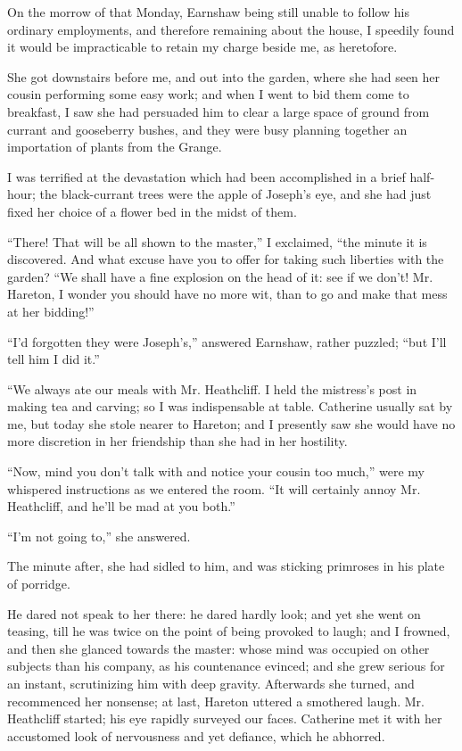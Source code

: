 \par On the morrow of that Monday, Earnshaw being still unable to follow his ordinary employments, and therefore remaining about the house, I speedily found it would be impracticable to retain my charge beside me, as heretofore.
\par She got downstairs before me, and out into the garden, where she had seen her cousin performing some easy work; and when I went to bid them come to breakfast, I saw she had persuaded him to clear a large space of ground from currant and gooseberry bushes, and they were busy planning together an importation of plants from the Grange.
\par I was terrified at the devastation which had been accomplished in a brief half-hour; the black-currant trees were the apple of Joseph's eye, and she had just fixed her choice of a flower bed in the midst of them.
\par “There! That will be all shown to the master,” I exclaimed, “the minute it is discovered. And what excuse have you to offer for taking such liberties with the garden? “We shall have a fine explosion on the head of it: see if we don't! Mr. Hareton, I wonder you should have no more wit, than to go and make that mess at her bidding!”
\par “I'd forgotten they were Joseph's,” answered Earnshaw, rather puzzled; “but I'll tell him I did it.”
\par “We always ate our meals with Mr. Heathcliff. I held the mistress's post in making tea and carving; so I was indispensable at table. Catherine usually sat by me, but today she stole nearer to Hareton; and I presently saw she would have no more discretion in her friendship than she had in her hostility.
\par “Now, mind you don't talk with and notice your cousin too much,” were my whispered instructions as we entered the room. “It will certainly annoy Mr. Heathcliff, and he'll be mad at you both.”
\par “I'm not going to,” she answered.
\par The minute after, she had sidled to him, and was sticking primroses in his plate of porridge.
\par He dared not speak to her there: he dared hardly look; and yet she went on teasing, till he was twice on the point of being provoked to laugh; and I frowned, and then she glanced towards the master: whose mind was occupied on other subjects than his company, as his countenance evinced; and she grew serious for an instant, scrutinizing him with deep gravity. Afterwards she turned, and recommenced her nonsense; at last, Hareton uttered a smothered laugh. Mr. Heathcliff started; his eye rapidly surveyed our faces. Catherine met it with her accustomed look of nervousness and yet defiance, which he abhorred.
